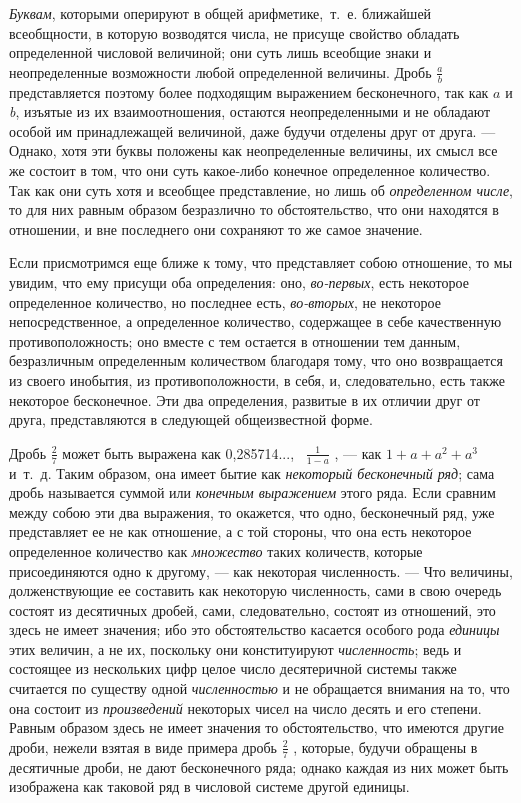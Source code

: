 {{\em Буквам}, которыми оперируют в общей
арифметике,~т.~е. ближайшей всеобщности, в которую возводятся числа, не
присуще свойство обладать определенной числовой величиной; они суть лишь
всеобщие знаки и неопределенные возможности любой определенной величины.
Дробь  $\frac a b$  представляется поэтому более подходящим выражением
бесконечного, так как $a$ и
{\em b}, изъятые из их взаимоотношения, остаются
неопределенными и не обладают особой им принадлежащей величиной, даже
будучи отделены друг от друга. — Однако, хотя эти буквы положены как
неопределенные величины, их смысл все же состоит в том, что они суть
какое-либо конечное определенное количество. Так как они суть хотя и
всеобщее представление, но лишь об {\em определенном
числе}, то для них равным образом безразлично то обстоятельство, что они
находятся в отношении, и вне последнего они сохраняют то же самое значение.

Если присмотримся еще ближе к тому, что представляет собою отношение, то мы
увидим, что ему присущи оба определения: оно,
{\em во-первых}, есть некоторое определенное
количество, но последнее есть, {\em во-вторых}, не
некоторое непосредственное, а определенное количество, содержащее в себе
качественную противоположность; оно вместе с тем остается в отношении тем
данным, безразличным определенным количеством благодаря тому, что оно
возвращается из своего инобытия, из противоположности, в себя, и,
следовательно, есть также некоторое бесконечное. Эти два определения,
развитые в их отличии друг от друга, представляются в следующей
общеизвестной форме.

Дробь  $\frac 2 7$  может быть выражена как 0,285714..., \  $\frac 1{1-a}$ ,
— как  $1 + a + a^2 + a^3$  и~т.~д. Таким образом, она имеет бытие как
{\em некоторый бесконечный ряд}; сама дробь называется
суммой или {\em конечным выражением} этого ряда. Если
сравним между собою эти два выражения, то окажется, что одно, бесконечный
ряд, уже представляет ее не как отношение, а с той стороны, что она есть
некоторое определенное количество как {\em множество}
таких количеств, которые присоединяются одно к другому, — как некоторая
численность. — Что величины, долженствующие ее составить как некоторую
численность, сами в свою очередь состоят из десятичных дробей, сами,
следовательно, состоят из отношений, это здесь не имеет значения; ибо это
обстоятельство касается особого рода {\em единицы} этих
величин, а не их, поскольку они конституируют
{\em численность}; ведь и состоящее из нескольких цифр
целое число десятеричной системы также считается по существу одной
{\em численностью} и не обращается внимания на то, что
она состоит из {\em произведений} некоторых чисел на
число десять и его степени. Равным образом здесь не имеет значения то
обстоятельство, что имеются другие дроби, нежели взятая в виде примера
дробь  $\frac 2 7$ , которые, будучи обращены в десятичные дроби, не дают
бесконечного ряда; однако каждая из них может быть изображена как таковой
ряд в числовой системе другой единицы.

}
